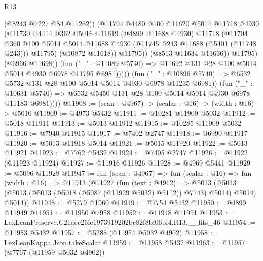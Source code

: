 \begin{lexlean}{R13}
\begin{coremodule}
                              (@8243 @7227 @84 @11262))
                            (@11704
                              @4480
                              @100
                              @11620
                              @5014
                              @11718
                              @4930
                              (@11730
                                @4414
                                @362
                                @5016
                                @11619
                                (@4899 @11688 @4930)
                                @11718
                                (@11704
                                  @360
                                  @100
                                  @5014
                                  @5014
                                  @11688
                                  @4930
                                  (@11745 @243 @11688 (@5401 (@11748 @243)))
                                  @11795)
                                (@10872 @11618))
                              @11795))
                          (@8513 @11634 @11636))
                        @11795)
                      (@6966 @11698))
                    (fun ("_" : @11089 @5740) =>
                    @11692 @131 @28 @100 @5014 @5014 @4930 @6978 @11795 @6981)))))
            (fun ("_" : @10896 @5740) =>
            @6532 @5732 @131 @28 @100 @5014 @5014 @4930 @6978 @11235 @6981))
          (fun ("_" : @10631 @5740) =>
          @6532 @5450 @131 @28 @100 @5014 @5014 @4930 @6978 @11183 @6981))))
@11908 := (scan : @4967) -> (scalar : @16) -> (width : @16) -> @5010
@11909 := @4973 @5432
@11911 := @10281 @11909 @5032
@11912 := @5018 @11911
@11913 := @5013 @11912
@11915 := @10285 @11909 @5032
@11916 := @7940 @11915
@11917 := @7402 @2747
@11918 := @6990 @11917
@11920 := @5013 @11918 @5014
@11921 := @5015 @11920
@11922 := @5013 @11921
@11923 := @7762 @5432
@11924 := @7405 @2747
@11926 := @11922 (@11923 @11924)
@11927 := @11916 @11926
@11928 := @4969 @5441
@11929 := @5096 @11928
@11947 := fun (scan : @4967) =>
  fun (scalar : @16) =>
  fun (width : @16) =>
  @11913
    (@11927
      (fun (text : @4912) =>
      @5013 (@5013 (@5013 (@5013 (@5018 (@5087 (@11929 @5032) @5112)) @7743) @5014) @5014) @5014))
@11948 := @5279 @1960
@11949 := @7754 @5432
@11950 := @4899 @11949
@11951 := @11950 @7958
@11952 := @11948 @11951
@11953 := LexLeanPreserve.C21aec26fe1973919202bc82f8bf06bf4.R13.__fits_46
@11954 := @11953 @5432
@11957 := @5288 (@11954 @5032 @4902)
@11958 := LexLeanKappa.Json.takeScalar
@11959 := @11958 @5432
@11963 := @11957 (@7767 (@11959 @5032 @4902))

\end{coremodule}
\end{lexlean}

